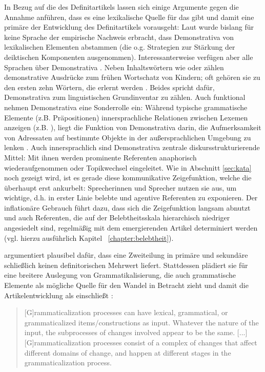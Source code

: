 In Bezug auf die  des Definitartikels  lassen sich einige Argumente gegen die Annahme anführen, dass es eine lexikalische Quelle für das  gibt und damit eine primäre  der Entwicklung des Definitartikels vorausgeht: Laut \textcite[150]{Diessel1999} wurde bislang für keine Sprache der empirische Nachweis erbracht, dass Demonstrativa  von lexikalischen Elementen abstammen (die o.g. Strategien zur Stärkung der deiktischen Komponenten ausgenommen). Interessanterweise verfügen aber alle Sprachen über Demonstrativa  \parencite[1]{Diessel1999}. Neben Inhaltswörtern wie  oder  zählen demonstrative Ausdrücke zum frühen Wortschatz von Kindern; oft gehören sie zu den ersten zehn Wörtern, die erlernt werden \parencite[476]{Diessel2006}. Beides spricht dafür, Demonstrativa  zum linguistischen Grundinventar zu zählen. Auch funktional nehmen Demonstrativa  eine Sonderrolle ein: Während typische grammatische Elemente (z.B. Präpositionen) innersprachliche Relationen zwischen Lexemen anzeigen (z.B. ), liegt die Funktion von Demonstrativa  darin, die Aufmerksamkeit von Adressaten auf bestimmte Objekte in der außersprachlichen Umgebung zu lenken \parencites{Diessel2006}. 
Auch innersprachlich sind Demonstrativa  zentrale diskursstrukturierende Mittel: Mit ihnen werden prominente Referenten anaphorisch  wiederaufgenommen oder Topikwechsel  eingeleitet. Wie in Abschnitt \ref{sec:kata} noch gezeigt wird, ist es gerade diese kommunikative Zeigefunktion, welche die  überhaupt erst ankurbelt: Sprecherinnen und Sprecher nutzen sie aus, um wichtige, d.h. in erster Linie belebte und agentive Referenten   zu exponieren. Der inflationäre Gebrauch führt dazu, dass sich die Zeigefunktion langsam abnutzt und auch Referenten, die auf der Belebtheitsskala  hierarchisch niedriger angesiedelt sind, regelmäßig mit dem emergierenden Artikel  determiniert werden (vgl. hierzu ausführlich Kapitel ~\ref{chapter:belebtheit}).


\textcite{Breban2014} argumentiert plausibel dafür, dass eine Zweiteilung in primäre und sekundäre  schließlich keinen definitorischen Mehrwert liefert.
Stattdessen plädiert sie für eine breitere Auslegung von Grammatikalisierung, die auch grammatische Elemente als mögliche Quelle für den Wandel in Betracht zieht und damit die Artikelentwicklung als  einschließt  \parencite[zur weiterführenden Diskussion s.][]{Breban2012}: \blockcquote[498]{Breban2014}{[G]rammaticalization processes can have lexical, grammatical, or grammaticalized items/constructions as input. Whatever the nature of the input, the subprocesses of changes involved appear to be the same. [...] [G]ramma\-ticalization processes consist of a complex of changes that affect different domains of change, and happen at different stages in the grammaticalization process.}

